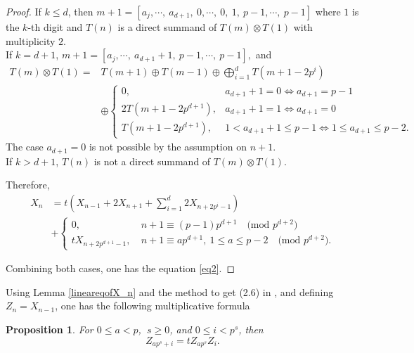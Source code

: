 \documentclass[11 pt]{amsart}
\theoremstyle{plain}
\newtheorem{prop}[thm]{Proposition}
\theoremstyle{definition}
\theoremstyle{remark}
\def\xx{\otimes}
\begin{document}
\begin{proof}
If $k \le d$, then $m+1=[a_j, \cdots, \ a_{d+1},\ 0, \cdots,\ 0, \ 1,\ p-1, \cdots, \ p-1]$ where $1$ is the $k$-th digit and $T(n)$ is a direct summand of $T(m)\xx T(1)$ with multiplicity $2$.
\\

If $k=d+1$, $m+1=[a_j, \cdots, \ a_{d+1}+1,\ p-1, \cdots, \ p-1],$ and \begin{align*}
    T(m)\xx T(1)=&T(m+1) \oplus T (m-1) \oplus \bigoplus_{i=1}^dT(m+1-2p^i)\\
    &\oplus \begin{cases}
        0, &a_{d+1}+1=0 \Leftrightarrow a_{d+1}=p-1\\
        2T(m+1-2p^{d+1}), &a_{d+1}+1=1 \Leftrightarrow a_{d+1}=0\\
        T(m+1-2p^{d+1}), &1<a_{d+1}+1 \le p-1 \Leftrightarrow 1 \le a_{d+1} \le p-2.
    \end{cases}
\end{align*}
The case $a_{d+1}=0$ is not possible by the assumption on $n+1$.
\\

If $k>d+1$, $T(n)$ is not a direct summand of $T(m)\xx T(1)$.

Therefore, \begin{align*}
    X_n&=t(X_{n-1}+2X_{n+1}+\sum_{i=1}^d 2X_{n+2p^i-1})\\
    &+\begin{cases}
        0,\ &n+1\equiv (p-1)p^{d+1} 
\quad  \text{(mod $p^{d+2}$)}\\
        tX_{n+2p^{d+1}-1},\ &n+1\equiv ap^{d+1},\ 1\le a \le p-2 \quad \text{(mod $p^{d+2}$)}.
\end{cases}
\end{align*}

Combining both cases, one has the equation \eqref{eq2}.
\end{proof}


Using Lemma \ref{lineareqofX_n} and the method to get (2.6) in \cite{larsen2024boundsmathrmsl2indecomposablestensorpowers}, and defining $Z_n=X_{n-1}$, one has the following multiplicative formula 

\begin{prop} \label{ap^s+n=ap^s+n}
    For $0\le a<p$, $\ s \ge 0$, and $0 \le i < p^s$, then
    $$Z_{ap^s+i}=tZ_{ap^s}Z_i.$$    
\end{prop}
\end{document}
